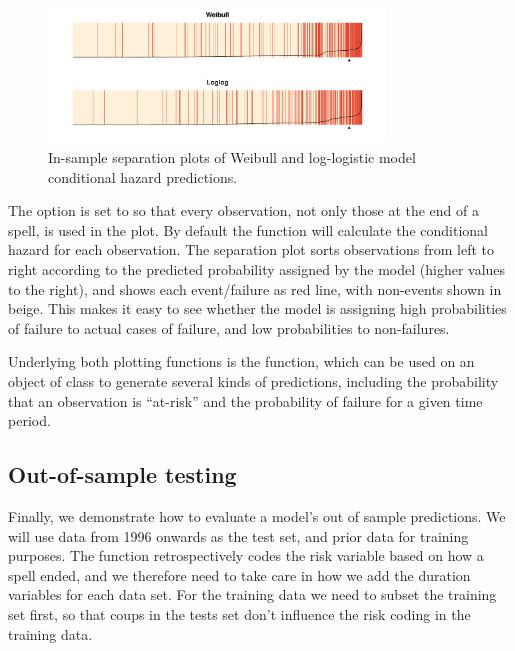 \documentclass[article]{jss}
\begin{document}
\begin{figure}
\begin{center}
\includegraphics[width=0.8\textwidth]{graphics/sepplots.pdf}
\caption{In-sample separation plots of Weibull and log-logistic model conditional hazard predictions.}
\label{insamp}
\end{center}
\end{figure}

The option  is set to  so that every
observation, not only those at the end of a spell, is used in the plot.
By default the  function will calculate the conditional
hazard for each observation. The separation plot sorts observations from
left to right according to the predicted probability assigned by the
model (higher values to the right), and shows each event/failure as red
line, with non-events shown in beige. This makes it easy to see whether
the model is assigning high probabilities of failure to actual cases of
failure, and low probabilities to non-failures.

Underlying both plotting functions is the  function, which
can be used on an object of class  to generate several kinds
of predictions, including the probability that an observation is
``at-risk'' and the probability of failure for a given time period.

\subsection{Out-of-sample testing}\label{out-of-sample-testing}

Finally, we demonstrate how to evaluate a model's out of sample
predictions. We will use data from 1996 onwards as the test set, and
prior data for training purposes. The  function
retrospectively codes the risk variable based on how a spell ended, and
we therefore need to take care in how we add the duration variables for
each data set. For the training data we need to subset the training set
first, so that coups in the tests set don't influence the risk coding in
the training data.
\end{document}
